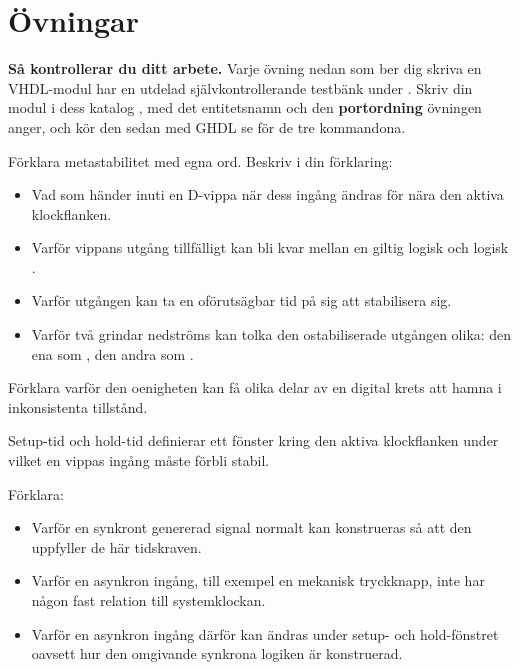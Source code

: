
\section{Övningar}
\label{c4:sec:exercises}

\begin{aside}
\textbf{Så kontrollerar du ditt arbete.} Varje övning nedan som ber dig skriva en VHDL-modul har
en utdelad självkontrollerande testbänk under . Skriv din modul i
dess katalog , med det entitetsnamn och den \textbf{portordning}
övningen anger, och kör den sedan med GHDL \textemdash{} se  för de tre
kommandona.
\end{aside}


\label{c4:ex:meta}
Förklara metastabilitet med egna ord. Beskriv i din förklaring:
\begin{itemize}
  \item Vad som händer inuti en D-vippa när dess ingång ändras för nära den aktiva klockflanken.
  \item Varför vippans utgång tillfälligt kan bli kvar mellan en giltig logisk  och logisk
    .
  \item Varför utgången kan ta en oförutsägbar tid på sig att stabilisera sig.
  \item Varför två grindar nedströms kan tolka den ostabiliserade utgången olika: den ena som
    , den andra som .
\end{itemize}

Förklara varför den oenigheten kan få olika delar av en digital krets att hamna i inkonsistenta
tillstånd.

\label{c4:ex:setup}
Setup-tid och hold-tid definierar ett fönster kring den aktiva klockflanken under vilket en vippas
ingång måste förbli stabil.

Förklara:
\begin{itemize}
  \item Varför en synkront genererad signal normalt kan konstrueras så att den uppfyller de här
    tidskraven.
  \item Varför en asynkron ingång, till exempel en mekanisk tryckknapp, inte har någon fast
    relation till systemklockan.
  \item Varför en asynkron ingång därför kan ändras under setup- och hold-fönstret oavsett hur den
    omgivande synkrona logiken är konstruerad.
\end{itemize}

